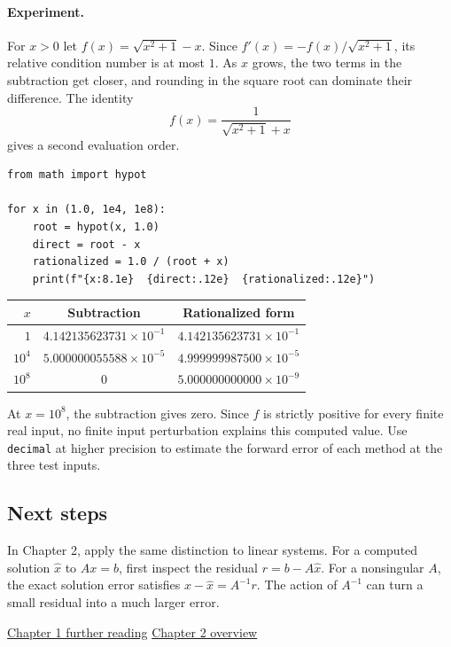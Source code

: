 \documentclass[11pt,letterpaper]{article}
\begin{document}
\paragraph{Experiment.} For $x>0$ let $f(x)=\sqrt{x^2+1}-x$. Since
$f'(x)=-f(x)/\sqrt{x^2+1}$, its relative condition number is at most $1$.
As $x$ grows, the two terms in the subtraction get closer, and rounding
in the square root can dominate their difference. The identity
\[
   f(x)=\frac{1}{\sqrt{x^2+1}+x}
\]
gives a second evaluation order.

\begin{lstlisting}
from math import hypot

for x in (1.0, 1e4, 1e8):
    root = hypot(x, 1.0)
    direct = root - x
    rationalized = 1.0 / (root + x)
    print(f"{x:8.1e}  {direct:.12e}  {rationalized:.12e}")
\end{lstlisting}

\begin{center}
  \small
  \begin{tabular}{@{}rcc@{}}
    \toprule
    $x$ & Subtraction & Rationalized form \\
    \midrule
    $1$      & $4.142135623731\times10^{-1}$ & $4.142135623731\times10^{-1}$ \\
    $10^4$   & $5.000000055588\times10^{-5}$ & $4.999999987500\times10^{-5}$ \\
    $10^8$   & $0$ & $5.000000000000\times10^{-9}$ \\
    \bottomrule
  \end{tabular}
\end{center}

At $x=10^8$, the subtraction gives zero. Since $f$ is strictly positive
for every finite real input, no finite input perturbation explains this
computed value. Use \texttt{decimal} at higher precision to estimate
the forward error of each method at the three test inputs.

\subsection*{Next steps}
In Chapter 2, apply the same distinction to linear systems. For a computed
solution $\widehat{x}$ to $Ax=b$, first inspect the residual
$r=b-A\widehat{x}$. For a nonsingular $A$, the exact solution error
satisfies $x-\widehat{x}=A^{-1}r$. The action of $A^{-1}$ can turn a
small residual into a much larger error.

{\small
  \href{https://fncbook.com/next/}{Chapter 1 further reading}
  \enspace\textbullet\enspace
  \href{https://fncbook.com/python/overview-1/}{Chapter 2 overview}\par
}
\end{document}
